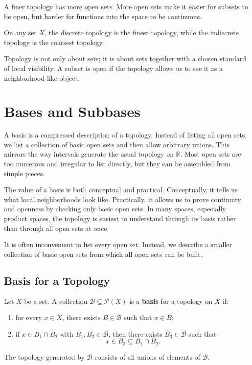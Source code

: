 A finer topology has more open sets. More open sets make it easier for subsets to be open, but harder for functions into the space to be continuous.

\begin{example}
On any set $X$, the discrete topology is the finest topology, while the indiscrete topology is the coarsest topology.
\end{example}

\begin{remark}
Topology is not only about sets; it is about sets together with a chosen standard of local visibility. A subset is open if the topology allows us to see it as a neighborhood-like object.
\end{remark}

\section{Bases and Subbases}


A basis is a compressed description of a topology. Instead of listing all open sets, we list a collection of basic open sets and then allow arbitrary unions. This mirrors the way intervals generate the usual topology on $\mathbb{R}$. Most open sets are too numerous and irregular to list directly, but they can be assembled from simple pieces.

The value of a basis is both conceptual and practical. Conceptually, it tells us what local neighborhoods look like. Practically, it allows us to prove continuity and openness by checking only basic open sets. In many spaces, especially product spaces, the topology is easiest to understand through its basis rather than through all open sets at once.

It is often inconvenient to list every open set. Instead, we describe a smaller collection of basic open sets from which all open sets can be built.

\subsection{Basis for a Topology}

\begin{definition}[Basis]
Let $X$ be a set. A collection $\mathcal{B}\subseteq\mathcal{P}(X)$ is a \textbf{basis} for a topology on $X$ if:
\begin{enumerate}
    \item for every $x\in X$, there exists $B\in\mathcal{B}$ such that $x\in B$;
    \item if $x\in B_1\cap B_2$ with $B_1,B_2\in\mathcal{B}$, then there exists $B_3\in\mathcal{B}$ such that
    \[
        x\in B_3\subseteq B_1\cap B_2.
    \]
\end{enumerate}
The topology generated by $\mathcal{B}$ consists of all unions of elements of $\mathcal{B}$.
\end{definition}


